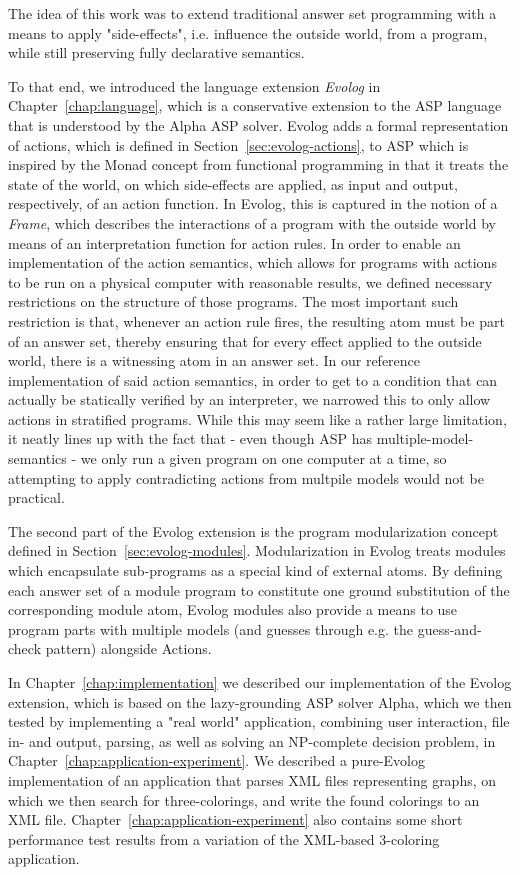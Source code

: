 The idea of this work was to extend traditional answer set programming with a means to apply "side-effects", i.e. influence the outside world, from a program, while still preserving fully declarative semantics. 

To that end, we introduced the language extension \emph{Evolog} in Chapter~\ref{chap:language}, which is a conservative extension to the ASP language that is understood by the Alpha ASP solver. Evolog adds a formal representation of actions, which is defined in Section~\ref{sec:evolog-actions}, to ASP which is inspired by the Monad concept from functional programming in that it treats the state of the world, on which side-effects are applied, as input and output, respectively, of an action function. In Evolog, this is captured in the notion of a \emph{Frame}, which describes the interactions of a program with the outside world by means of an interpretation function for action rules. In order to enable an implementation of the action semantics, which allows for programs with actions to be run on a physical computer with reasonable results, we defined necessary restrictions on the structure of those programs. The most important such restriction is that, whenever an action rule fires, the resulting atom must be part of an answer set, thereby ensuring that for every effect applied to the outside world, there is a witnessing atom in an answer set. In our reference implementation of said action semantics, in order to get to a condition that can actually be statically verified by an interpreter, we narrowed this to only allow actions in stratified programs. While this may seem like a rather large limitation, it neatly lines up with the fact that - even though ASP has multiple-model-semantics - we only run a given program on one computer at a time, so attempting to apply contradicting actions from multpile models would not be practical.

The second part of the Evolog extension is the program modularization concept defined in Section~\ref{sec:evolog-modules}. Modularization in Evolog treats modules which encapsulate sub-programs as a special kind of external atoms. By defining each answer set of a module program to constitute one ground substitution of the corresponding module atom, Evolog modules also provide a means to use program parts with multiple models (and guesses through e.g. the guess-and-check pattern) alongside Actions.

In Chapter~\ref{chap:implementation} we described our implementation of the Evolog extension, which is based on the lazy-grounding ASP solver Alpha, which we then tested by implementing a "real world" application, combining user interaction, file in- and output, parsing, as well as solving an NP-complete decision problem, in Chapter~\ref{chap:application-experiment}. We described a pure-Evolog implementation of an application that parses XML files representing graphs, on which we then search for three-colorings, and write the found colorings to an XML file. Chapter~\ref{chap:application-experiment} also contains some short performance test results from a variation of the XML-based 3-coloring application.

